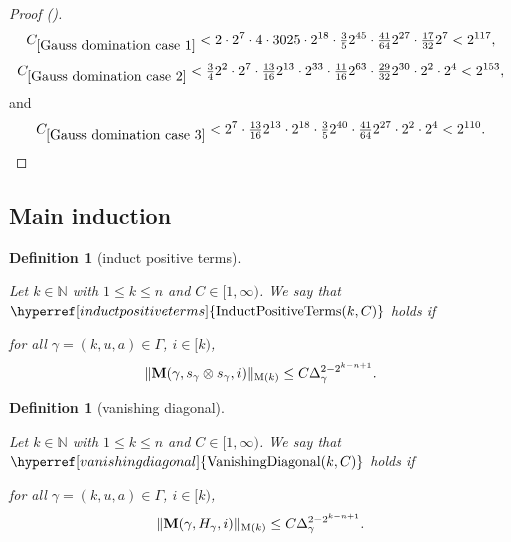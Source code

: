 \documentclass[12pt,reqno]{amsart}
\newcommand{\auto}{{({\tiny\faCar})}}
\theoremstyle{plain}
\newtheorem{definition}[theorem]{Definition}
\numberwithin{equation}{section}
\theoremstyle{remark}
\newcommand{\uses}[1]{}
\newcommand{\usesdefs}[1]{}
\newcommand{\lean}[1]{}
\newcommand{\N}{{\mathbb N}}
\newcommand{\M}{\mathbf{M}}
\begin{document}
\begin{proof}[Proof \auto]
\[
C_{\ref{Gauss domination case 1}}
<2\cdot2^7\cdot4\cdot3025\cdot2^{18}
\cdot\tfrac35 2^{45}\cdot\tfrac{41}{64}2^{27}\cdot\tfrac{17}{32}2^7
<2^{117},
\]
\[
C_{\ref{Gauss domination case 2}}
<\tfrac34 2^2\cdot2^7\cdot\tfrac{13}{16}2^{13}\cdot2^{33}
\cdot\tfrac{11}{16}2^{63}\cdot\tfrac{29}{32}2^{30}\cdot2^2\cdot2^4
<2^{153},
\]
and
\[
C_{\ref{Gauss domination case 3}}
<2^7\cdot\tfrac{13}{16}2^{13}\cdot2^{18}
\cdot\tfrac35 2^{40}\cdot\tfrac{41}{64}2^{27}\cdot2^2\cdot2^4
<2^{110}.
\]
\end{proof}

\subsection{Main induction}

\newcommand{\InductPositiveTerms}[1]{{\hyperref[induct positive terms]{{\rm InductPositiveTerms}(#1)}}}
\begin{definition}[induct positive terms]\label{induct positive terms}\uses{}\usesdefs{geometric parameters,kernel sequences,sandwich kernel,s multiplier}
\lean{Auto.InductPositiveTerms}
Let $k\in \N$ with $1\le k\le n$ and $C\in [1,\infty)$.
We say that $\InductPositiveTerms{k,C}$ holds if

for all $\gamma=(k,u,a)\in \Gamma$, $i\in [k)$,
\begin{equation}\label{auto:positive-terms-square-root-bound}
    \|\M(\gamma,s_{\gamma} \otimes s_{\gamma},i)\|_{{\rm M}(k)}\le C \Delta_\gamma^{2-2^{k-n+1}}.
\end{equation}
\end{definition}

\newcommand{\VanishingDiagonal}[1]{{\hyperref[vanishing diagonal]{{\rm VanishingDiagonal}(#1)}}}
\begin{definition}[vanishing diagonal]\label{vanishing diagonal}\uses{}\usesdefs{geometric parameters,kernel sequences,sandwich kernel,H multiplier}
\lean{Auto.VanishingDiagonal}
Let $k\in \N$ with $1\le k\le n$ and $C\in [1,\infty)$.
We say that $\VanishingDiagonal{k,C}$ holds if

for all $\gamma=(k,u,a)\in \Gamma$, $i\in [k)$,
\begin{equation}\label{auto:H-positive-terms-bound}
    \|\M(\gamma,H_\gamma,i)\|_{{\rm M}(k)}
    \le C \Delta_\gamma^{2-2^{k-n+1}} .
\end{equation}
\end{definition}
\end{document}
